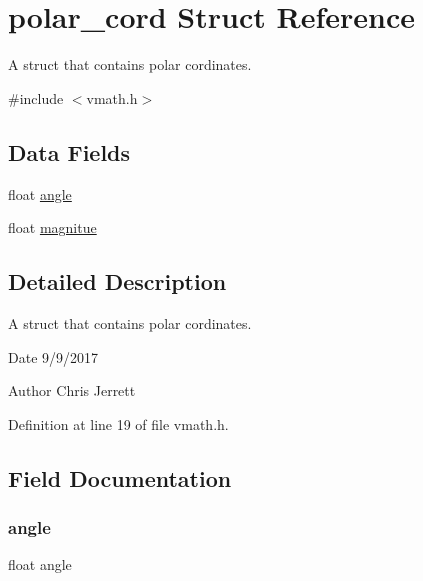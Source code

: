\hypertarget{structpolar__cord}{}\section{polar\+\_\+cord Struct Reference}
\label{structpolar__cord}


A struct that contains polar cordinates.  




{\ttfamily \#include $<$vmath.\+h$>$}

\subsection*{Data Fields}
\begin{DoxyCompactItemize}
\item 
float \hyperlink{structpolar__cord_ab8ef1bf8a70cc07c6d55823c390a7e76}{angle}
\item 
float \hyperlink{structpolar__cord_a16ebe6028d7fa6cbd5cd673819eecb9f}{magnitue}
\end{DoxyCompactItemize}


\subsection{Detailed Description}
A struct that contains polar cordinates. 

\begin{DoxyDate}{Date}
9/9/2017 
\end{DoxyDate}
\begin{DoxyAuthor}{Author}
Chris Jerrett 
\end{DoxyAuthor}


Definition at line 19 of file vmath.\+h.



\subsection{Field Documentation}
\mbox{\label{structpolar__cord_ab8ef1bf8a70cc07c6d55823c390a7e76}} 
\subsubsection{\texorpdfstring{angle}{angle}}
{\footnotesize\ttfamily float angle}



